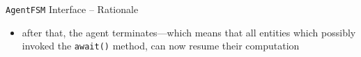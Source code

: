 \documentclass[presentation]{beamer}\mode<presentation>{\usetheme{AMSCesenaPurpleAndGold}}
\begin{document}
\begin{frame}[allowframebreaks]{\texttt{AgentFSM} Interface -- Rationale}
\begin{itemize}












        \item after that, the agent \alert{terminates}---which means that all entities which possibly invoked the \texttt{\alert{await()}} method, can now resume their computation


\end{itemize}
\end{frame}
\end{document}
